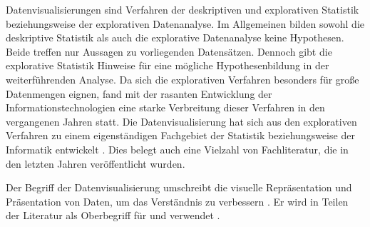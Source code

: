 %

Datenvisualisierungen sind Verfahren der deskriptiven und explorativen Statistik beziehungsweise der explorativen Datenanalyse. 
Im Allgemeinen bilden sowohl die deskriptive Statistik als auch die explorative Datenanalyse keine Hypothesen. Beide treffen nur Aussagen zu vorliegenden Datensätzen. 
Dennoch gibt die explorative Statistik Hinweise für eine mögliche Hypothesenbildung in der weiterführenden Analyse. 
Da sich die explorativen Verfahren besonders für große Datenmengen eignen, fand mit der rasanten Entwicklung der Informationstechnologien 
eine starke Verbreitung dieser Verfahren in den vergangenen Jahren statt. Die Datenvisualisierung hat sich aus den explorativen Verfahren zu einem eigenständigen Fachgebiet der Statistik 
beziehungsweise der Informatik entwickelt \cite[vgl.][28 f.]{becker_stochastische_2016}. Dies belegt auch eine Vielzahl von Fachliteratur, die in den letzten Jahren veröffentlicht wurden.


Der Begriff der Datenvisualisierung umschreibt die visuelle Repräsentation und Präsentation von Daten, um das Verständnis zu verbessern \cite[vgl.][15 ff.]{kirk_data_2019}.
Er wird in Teilen der Literatur als Oberbegriff für  und 
 verwendet \cite[vgl.][11]{few_now_2009}.

